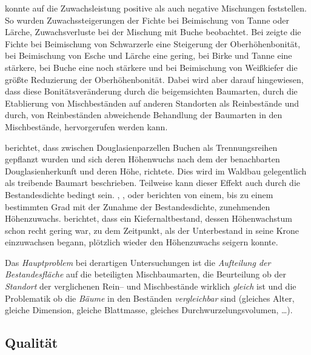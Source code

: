 \documentclass[twocolumn]{scrartcl}
\begin{document}
\cite{vospernik2021grundflaechenzuwachs} konnte auf die
Zuwachsleistung positive als auch negative Mischungen feststellen. So
wurden Zuwachssteigerungen der Fichte bei Beimischung von Tanne oder
Lärche, Zuwachsverluste bei der Mischung mit Buche beobachtet. Bei
\cite{kindermann2018siteIndex} zeigte die Fichte bei Beimischung von
Schwarzerle eine Steigerung der Oberhöhenbonität, bei Beimischung von
Esche und Lärche eine gering, bei Birke und Tanne eine stärkere, bei
Buche eine noch stärkere und bei Beimischung von Weißkiefer die größte
Reduzierung der Oberhöhenbonität. Dabei wird aber darauf hingewiesen,
dass diese Bonitätsveränderung durch die beigemsichten Baumarten,
durch die Etablierung von Mischbeständen auf anderen Standorten als
Reinbestände und durch, von Reinbeständen abweichende Behandlung der
Baumarten in den Mischbestände, hervorgerufen werden kann.

\cite[S.~259]{muench1928KlimarassenDerDouglasie} berichtet, dass
zwischen Douglasienparzellen Buchen als Trennungsreihen gepflanzt
wurden und sich deren Höhenwuchs nach dem der benachbarten
Douglasienherkunft und deren Höhe, richtete. Dies wird im Waldbau
gelegentlich als treibende Baumart beschrieben. Teilweise kann dieser
Effekt auch durch die Bestandesdichte bedingt sein.
\cite{boehmerle1903BestandesdichteUndBestandeshoehe},
\cite{schmied1928UeberDenEinflussDerBestandesdichteAufDieBestandeshoeheInJuengerenBuchenbestaenden},
\cite[S.~75--76]{wiedemann1951Ertragskunde} oder
\cite[S.~46--47]{assmann1961Waldertraskunde} berichten von einem, bis
zu einem bestimmten Grad mit der Zunahme der Bestandesdichte,
zunehmenden Höhenzuwachs.
\cite{zundel1960ErtragskundlicheUntersuchungenInZweialtrigenBestaendenNordwuerttembergs}
berichtet, dass ein Kiefernaltbestand, dessen Höhenwachstum schon
recht gering war, zu dem Zeitpunkt, als der Unterbestand in seine
Krone einzuwachsen begann, plötzlich wieder den Höhenzuwachs seigern
konnte.

Das \emph{Hauptproblem} bei derartigen Untersuchungen ist die
\emph{Aufteilung der Bestandesfläche} auf die beteiligten
Mischbaumarten, die Beurteilung ob der \emph{Standort} der
verglichenen Rein-- und Mischbestände wirklich \emph{gleich} ist und
die Problematik ob die \emph{Bäume} in den Beständen
\emph{vergleichbar} sind (gleiches Alter, gleiche Dimension, gleiche
Blattmasse, gleiches Durchwurzelungsvolumen, \dots).

\subsection{Qualität}
\label{ssec:qualitaet}
\end{document}
